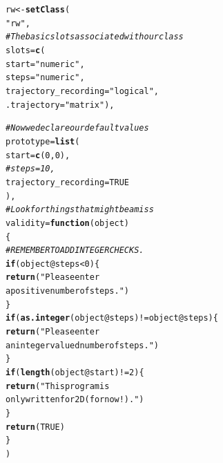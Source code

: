 \documentclass{article}\usepackage[]{graphicx}\usepackage[]{color}
\makeatletter
\newcommand{\hlnum}[1]{\textcolor[rgb]{0.686,0.059,0.569}{#1}}%
\newcommand{\hlstr}[1]{\textcolor[rgb]{0.192,0.494,0.8}{#1}}%
\newcommand{\hlcom}[1]{\textcolor[rgb]{0.678,0.584,0.686}{\textit{#1}}}%
\newcommand{\hlopt}[1]{\textcolor[rgb]{0,0,0}{#1}}%
\newcommand{\hlstd}[1]{\textcolor[rgb]{0.345,0.345,0.345}{#1}}%
\newcommand{\hlkwa}[1]{\textcolor[rgb]{0.161,0.373,0.58}{\textbf{#1}}}%
\newcommand{\hlkwb}[1]{\textcolor[rgb]{0.69,0.353,0.396}{#1}}%
\newcommand{\hlkwc}[1]{\textcolor[rgb]{0.333,0.667,0.333}{#1}}%
\newcommand{\hlkwd}[1]{\textcolor[rgb]{0.737,0.353,0.396}{\textbf{#1}}}%
\newenvironment{kframe}{%
 \def\at@end@of@kframe{}%
 \ifinner\ifhmode%
  \def\at@end@of@kframe{\end{minipage}}%
  \begin{minipage}{\columnwidth}%
 \fi\fi%
 \def\FrameCommand##1{\hskip\@totalleftmargin \hskip-\fboxsep
 \colorbox{shadecolor}{##1}\hskip-\fboxsep
     \hskip-\linewidth \hskip-\@totalleftmargin \hskip\columnwidth}%
 \MakeFramed {\advance\hsize-\width
   \@totalleftmargin\z@ \linewidth\hsize
   \@setminipage}}%
 {\par\unskip\endMakeFramed%
 \at@end@of@kframe}
\newenvironment{knitrout}{}{} %
\makeatother
\begin{document}
\begin{knitrout}
\color{fgcolor}\begin{kframe}
\begin{alltt}
\hlstd{rw} \hlkwb{<-} \hlkwd{setClass}\hlstd{(}
  \hlstr{"rw"}\hlstd{,}
  \hlcom{# The basic slots associated with our class}
  \hlkwc{slots} \hlstd{=} \hlkwd{c}\hlstd{(}
    \hlkwc{start} \hlstd{=} \hlstr{"numeric"}\hlstd{,}
    \hlkwc{steps}   \hlstd{=} \hlstr{"numeric"}\hlstd{,}
    \hlkwc{trajectory_recording} \hlstd{=} \hlstr{"logical"}\hlstd{,}
    \hlkwc{.trajectory} \hlstd{=} \hlstr{"matrix"}\hlstd{),}

  \hlcom{# Now we declare our default values}
  \hlkwc{prototype}\hlstd{=}\hlkwd{list}\hlstd{(}
    \hlkwc{start} \hlstd{=} \hlkwd{c}\hlstd{(}\hlnum{0}\hlstd{,}\hlnum{0}\hlstd{),}
    \hlcom{#steps = 10,}
    \hlkwc{trajectory_recording} \hlstd{=} \hlnum{TRUE}
  \hlstd{),}
  \hlcom{# Look for things that might be amiss}
  \hlkwc{validity}\hlstd{=}\hlkwa{function}\hlstd{(}\hlkwc{object}\hlstd{)}
  \hlstd{\{}
    \hlcom{# REMEMBER TO ADD INTEGER CHECKS.}
    \hlkwa{if}\hlstd{(object}\hlopt{@}\hlkwc{steps}\hlopt{<}\hlnum{0}\hlstd{) \{}
      \hlkwd{return}\hlstd{(}\hlstr{"Please enter 
             a positive number of steps."}\hlstd{)}
    \hlstd{\}}
    \hlkwa{if}\hlstd{(}\hlkwd{as.integer}\hlstd{(object}\hlopt{@}\hlkwc{steps}\hlstd{)}\hlopt{!=}\hlstd{object}\hlopt{@}\hlkwc{steps}\hlstd{) \{}
      \hlkwd{return}\hlstd{(}\hlstr{"Please enter 
             an integer valued number of steps."}\hlstd{)}
    \hlstd{\}}
    \hlkwa{if}\hlstd{(}\hlkwd{length}\hlstd{(object}\hlopt{@}\hlkwc{start}\hlstd{)}\hlopt{!=}\hlnum{2}\hlstd{) \{}
      \hlkwd{return}\hlstd{(}\hlstr{"This program is
             only written for 2D (for now!)."}\hlstd{)}
    \hlstd{\}}
    \hlkwd{return}\hlstd{(}\hlnum{TRUE}\hlstd{)}
  \hlstd{\}}
\hlstd{)}



\end{alltt}
\end{kframe}
\end{knitrout}
\end{document}
